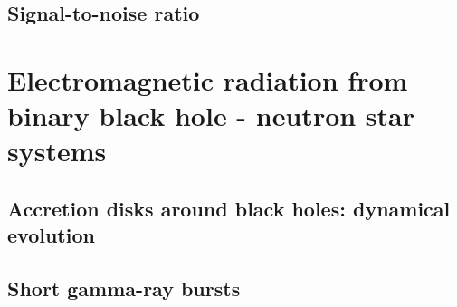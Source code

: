 \documentclass[binding=0.6cm, LaM]{sapthesis}
\begin{document}
\section{Signal-to-noise ratio}

\chapter{Electromagnetic radiation from binary black hole - neutron star systems}
\section{Accretion disks around black holes: dynamical evolution}
\section{Short gamma-ray bursts}
\section{} 





\backmatter
\cleardoublepage


\begin{thebibliography}{100}
\end{thebibliography}
\end{document}
